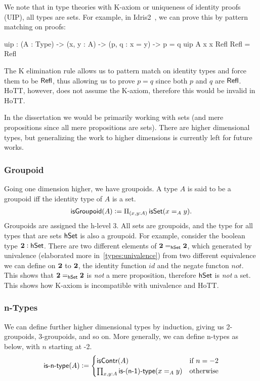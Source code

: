 We note that in type theories with K-axiom or uniqueness of identity proofs
(UIP), all types are sets. For example, in Idris2~\cite{brady_idris_2021},
we can prove this
by pattern matching on proofs:
\begin{code}
uip : (A : Type) -> (x, y : A) -> (p, q : x = y) -> p = q
uip A x x Refl Refl = Refl
\end{code}

The K elimination rule allows us to pattern match on identity types and force
them to be $\operatorname{\mathsf{Refl}}$, thus allowing us to prove $p = q$ since both
$p$ and $q$ are $\operatorname{\mathsf{Refl}}$. HoTT, however, does not assume the K-axiom,
therefore this would be invalid in HoTT.

In the dissertation we would be primarily working with sets
(and mere propositions since all mere propositions are sets).
There are higher dimensional types, but generalizing the work to
higher dimensions is currently left for future works.

\subsubsection{Groupoid}
Going one dimension higher, we have groupoids. A type $A$ is said to be a
groupoid iff the identity type of $A$ is a set.
\begin{align*}
    \operatorname{\mathsf{isGroupoid}}(A) := \Pi_{(x,y : A)}\operatorname{\mathsf{isSet}}(x =_A y).
\end{align*}
Groupoids are assigned the h-level 3. All sets are groupoids,
and the type for all types that are sets $\mathsf{hSet}$ is also a groupoid.
For example, consider the boolean type ${\mathbf{2}} : \mathsf{hSet}$. There are two
different elements of ${\mathbf{2}} =_{\mathsf{hSet}} {\mathbf{2}}$, which generated by
univalence (elaborated more in~\cref{types:univalence}) from two
different equivalence we can define on ${\mathbf{2}}$ to ${\mathbf{2}}$, the
identity function $id$ and the negate functon $not$.
This shows that ${\mathbf{2}} =_{\mathsf{hSet}} {\mathbf{2}}$ is \emph{not} a mere proposition,
therefore $\mathsf{hSet}$ is \emph{not} a set. This shows how K-axiom is
incompatible with univalence and HoTT.

\subsubsection{n-Types}
We can define further higher dimensional types by induction, giving us
2-groupoids, 3-groupoids, and so on. More generally, we can define
n-types as below, with $n$ starting at -2.
\begin{align*}
    \operatorname{\mathsf{is-n-type}}(A) := \begin{cases}
        \operatorname{\mathsf{isContr}}(A) & \text{if $n = -2$} \\
        \prod_{x, y : A}\operatorname{\mathsf{is-(n-1)-type}}(x =_A y) & \text{otherwise}
    \end{cases}
\end{align*}

